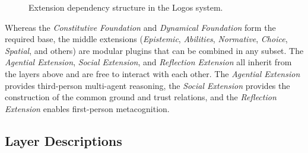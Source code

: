 \documentclass[../LogosReference.tex]{subfiles}
\begin{document}
\begin{figure}[htbp]
	\caption{Extension dependency structure in the Logos system.}
	\label{fig:extension-dependencies}
\end{figure}

Whereas the \textit{Constitutive Foundation} and \textit{Dynamical Foundation} form the required base, the middle extensions (\textit{Epistemic}, \textit{Abilities}, \textit{Normative}, \textit{Choice}, \textit{Spatial}, and others) are modular plugins that can be combined in any subset.
The \textit{Agential Extension}, \textit{Social Extension}, and \textit{Reflection Extension} all inherit from the layers above and are free to interact with each other.
The \textit{Agential Extension} provides third-person multi-agent reasoning, the \textit{Social Extension} provides the construction of the common ground and trust relations, and the \textit{Reflection Extension} enables first-person metacognition.


\subsection{Layer Descriptions}\label{sec:layer-descriptions}
\end{document}
